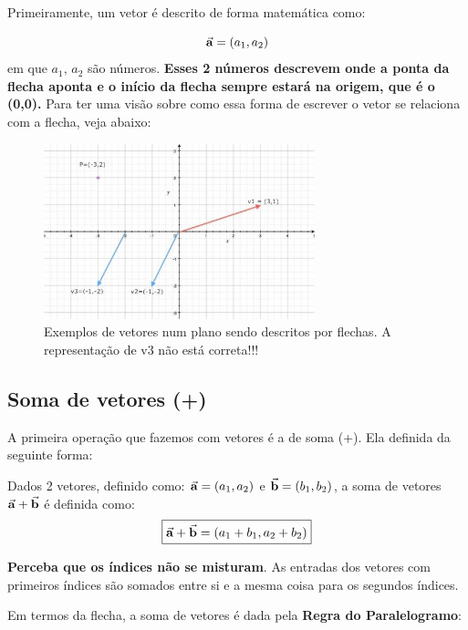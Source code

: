 \documentclass[12pt]{extarticle}
\newcommand{\<}{\langle}
\renewcommand{\>}{\rangle}
\theoremstyle{definition}
\begin{document}
Primeiramente, um vetor é descrito de forma matemática como:

\begin{equation}
    \va{a} = (a_1, a_2)
\end{equation}
em que $a_1,\,a_2$ são números. \textbf{Esses 2 números descrevem onde a ponta da flecha aponta e o início da flecha sempre estará na origem, que é o (0,0).} Para ter uma visão sobre como essa forma de escrever o vetor se relaciona com a flecha, veja abaixo:

\begin{figure}[H]
    \centering
    \includegraphics[width=0.7\textwidth]{vectors.jpg}
    \caption{Exemplos de vetores num plano sendo descritos por flechas. A representação de v3 não está correta!!!}
    \label{fig:vectors}
\end{figure}

\subsection{Soma de vetores (+)}

A primeira operação que fazemos com vetores é a de soma (+). Ela definida da seguinte forma:

Dados 2 vetores, definido como: $\va{a} = (a_1,a_2)$ e $\va{b} = (b_1,b_2)$, a soma de vetores $\va{a} + \va{b}$ é definida como:
\begin{equation}
    \boxed{\va{a} + \va{b} = (a_1+b_1, a_2+b_2)}
\end{equation}

\textbf{Perceba que os índices não se misturam}. As entradas dos vetores com primeiros índices são somados entre si e a mesma coisa para os segundos índices.

Em termos da flecha, a soma de vetores é dada pela \textbf{Regra do Paralelogramo}:
\end{document}
